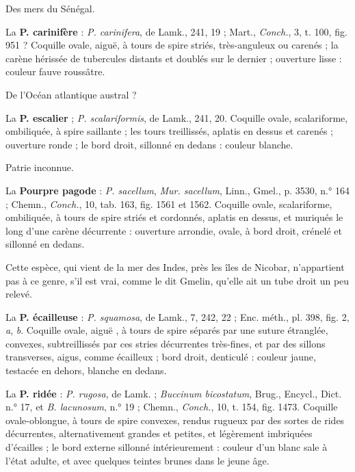 \documentclass[a4paper, 11pt, oneside, polutonikogreek, french]{article}
\begin{document}
Des mers du Sénégal.

\bigskip

La \textbf{P. carinifère} : \emph{P. carinifera}, de Lamk., 241, 19 ; Mart., \emph{Conch.}, 3, t. 100, fig. 951 ? Coquille ovale, aiguë, à tours de spire striés, très-anguleux ou carenés ; la carène hérissée de tubercules distants et doublés sur le dernier ; ouverture lisse : couleur fauve roussâtre.

De l'Océan atlantique austral ?

\bigskip

La \textbf{P. escalier} ; \emph{P. scalariformis}, de Lamk., 241, 20. Coquille ovale, scalariforme, ombiliquée, à spire saillante ; les tours treillissés, aplatis en dessus et carenés ; ouverture ronde ; le bord droit, sillonné en dedans : couleur blanche.

Patrie inconnue.

\bigskip

La \textbf{Pourpre pagode} : \emph{P. sacellum}, \emph{Mur. sacellum}, Linn., Gmel., p. 3530, n.° 164 ; Chemn., \emph{Conch.}, 10, tab. 163, fig. 1561 et 1562. Coquille ovale, scalariforme, ombiliquée, à tours de spire striés et cordonnés, aplatis en dessus, et muriqués le long d'une carène décurrente : ouverture arrondie, ovale, à bord droit, crénelé et sillonné en dedans.

Cette espèce, qui vient de la mer des Indes, près les îles de Nicobar, n'appartient pas à ce genre, s'il est vrai, comme le dit Gmelin, qu'elle ait un tube droit un peu relevé.

\bigskip

La \textbf{P. écailleuse} : \emph{P. squamosa}, de Lamk., 7, 242, 22 ; Enc. méth., pl. 398, fig. 2, \emph{a}, \emph{b}. Coquille ovale, aiguë , à tours de spire séparés par une suture étranglée, convexes, subtreillissés par ces stries décurrentes très-fines, et par des sillons transverses, aigus, comme écailleux ; bord droit, denticulé : couleur jaune, testacée en dehors, blanche en dedans.

\bigskip

La \textbf{P. ridée} : \emph{P. rugosa}, de Lamk. ; \emph{Buccinum bicostatum}, Brug., Encycl., Dict. n.° 17, et \emph{B. lacunosum}, n.° 19 ; Chemn., \emph{Conch.}, 10, t. 154, fig. 1473. Coquille ovale-oblongue, à tours de spire convexes, rendus rugueux par des sortes de rides décurrentes, alternativement grandes et petites, et légèrement imbriquées d'écailles ; le bord externe sillonné intérieurement : couleur d'un blanc sale à l'état adulte, et avec quelques teintes brunes dans le jeune âge.
\end{document}
